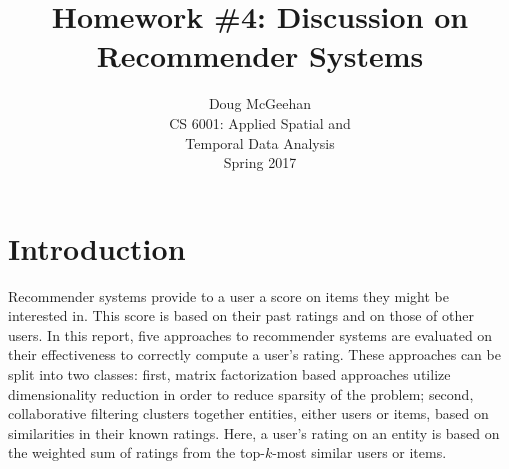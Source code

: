 \documentclass[11pt]{article}
\title{Homework \#4: Discussion on Recommender Systems}
\author{Doug McGeehan\\
		CS 6001: Applied Spatial and \\ Temporal Data Analysis\\
		Spring 2017}
\begin{document}
\maketitle

\section{Introduction}

Recommender systems provide to a user a score on items they might be interested in.
This score is based on their past ratings and on those of other users.
In this report, five approaches to recommender systems are evaluated on their effectiveness to correctly compute a user's rating.
These approaches can be split into two classes: first, matrix factorization based approaches utilize dimensionality reduction in order to reduce sparsity of the problem; second, collaborative filtering clusters together entities, either users or items, based on similarities in their known ratings.
Here, a user's rating on an entity is based on the weighted sum of ratings from the top-$k$-most similar users or items.
\end{document}
